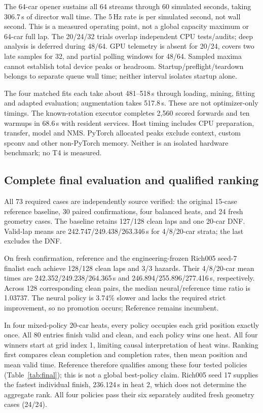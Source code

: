 \documentclass[conference]{IEEEtran}
\begin{document}
The 64-car opener sustains all 64 streams through 60 simulated seconds, taking 306.7\,s of director wall time. The 5\,Hz rate is per simulated second, not wall second. This is a measured operating point, not a global capacity maximum or 64-car full lap. The 20/24/32 trials overlap independent CPU tests/audits; deep analysis is deferred during 48/64. GPU telemetry is absent for 20/24, covers two late samples for 32, and partial polling windows for 48/64. Sampled maxima cannot establish total device peaks or headroom. Startup/preflight/teardown belongs to separate queue wall time; neither interval isolates startup alone.

The four matched fits each take about 481--518\,s through loading, mining, fitting and adapted evaluation; augmentation takes 517.8\,s. These are not optimizer-only timings. The known-rotation executor completes 2,560 scored forwards and ten warmups in 68.6\,s with resident services. Host timing includes CPU preparation, transfer, model and NMS. PyTorch allocated peaks exclude context, custom spconv and other non-PyTorch memory. Neither is an isolated hardware benchmark; no T4 is measured.

\subsection{Complete final evaluation and qualified ranking}
All 73 required cases are independently source verified: the original 15-case reference baseline, 30 paired confirmations, four balanced heats, and 24 fresh geometry cases. The baseline retains 127/128 clean laps and one 20-car DNF. Valid-lap means are 242.747/249.438/263.346\,s for 4/8/20-car strata; the last excludes the DNF.

On fresh confirmation, reference and the engineering-frozen Rich005 seed-7 finalist each achieve 128/128 clean laps and 3/3 hazards. Their 4/8/20-car mean times are 242.352/249.238/264.365\,s and 246.894/255.896/277.416\,s, respectively. Across 128 corresponding clean pairs, the median neural/reference time ratio is 1.03737. The neural policy is 3.74\% slower and lacks the required strict improvement, so no promotion occurs; Reference remains incumbent.

In four mixed-policy 20-car heats, every policy occupies each grid position exactly once. All 80 entries finish valid and clean, and each policy wins one heat. All four winners start at grid index 1, limiting causal interpretation of heat wins. Ranking first compares clean completion and completion rates, then mean position and mean valid time. Reference therefore qualifies among these four tested policies (Table~\ref{tab:final}); this is not a global best-policy claim. Rich005 seed 17 supplies the fastest individual finish, 236.124\,s in heat 2, which does not determine the aggregate rank. All four policies pass their six separately audited fresh geometry cases (24/24).

\end{document}
